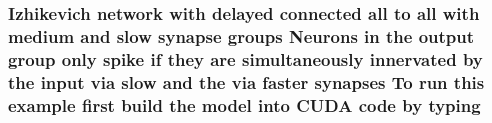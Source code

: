 \hypertarget{userproject_2SynDelay__project_2README_8txt_a3807d5f86d451e5167b0a9a5e0808fdd}{
\subsubsection[{typing}]{\setlength{\rightskip}{0pt plus 5cm}Izhikevich {\bf network} {\bf with} delayed connected all {\bf to} all {\bf with} medium and slow synapse {\bf groups} Neurons {\bf in} the output group only spike if they are simultaneously innervated by the input via slow and the via faster {\bf synapses} To run this example first build the {\bf model} into C\+U\+D\+A {\bf code} by typing}}\label{userproject_2SynDelay__project_2README_8txt_a3807d5f86d451e5167b0a9a5e0808fdd}
